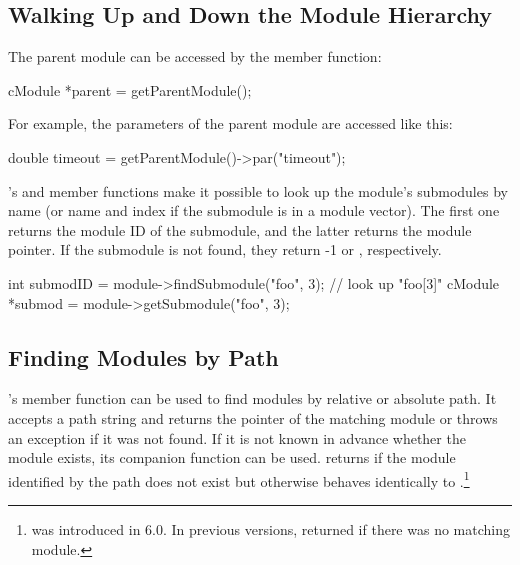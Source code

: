 \subsection{Walking Up and Down the Module Hierarchy}
\label{sec:simple-modules:walking-up-and-down-module-hierarchy}

The parent module can be accessed by the 
member function:

\begin{cpp}
cModule *parent = getParentModule();
\end{cpp}

For example, the parameters of the parent module are accessed
like this:

\begin{cpp}
double timeout = getParentModule()->par("timeout");
\end{cpp}

's  and 
member functions make it possible to look up the module's submodules
by name (or name and index if the submodule
is in a module vector). The first one returns the module ID of
the submodule, and the latter returns the module pointer. If the
submodule is not found, they return -1 or , respectively.

\begin{cpp}
int submodID = module->findSubmodule("foo", 3); // look up "foo[3]"
cModule *submod = module->getSubmodule("foo", 3);
\end{cpp}


\subsection{Finding Modules by Path}
\label{sec:simple-modules:finding-modules-by-path}

's  member function can be used to
find modules by relative or absolute path. It accepts a path string and
returns the pointer of the matching module or throws an exception if it
was not found. If it is not known in advance whether the module exists,
its companion function  can be used.
 returns  if the module
identified by the path does not exist but otherwise behaves identically
to .\footnote{ was
introduced in {\omnetpp} 6.0. In previous versions, 
returned  if there was no matching module.}

